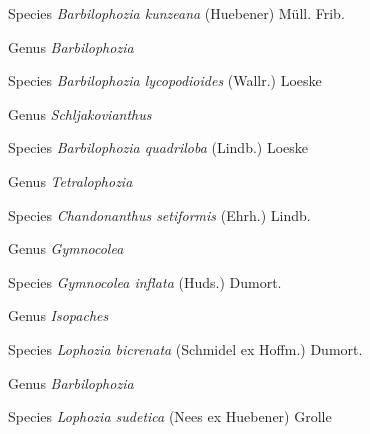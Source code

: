 \documentclass[9pt, article]{memoir}
\begin{document}
\begin{multicols}{2}
\vspace{6pt}\noindent\hspace{36pt}Species \textit{Barbilophozia kunzeana} (Huebener) Müll. Frib.


\vspace{6pt}\noindent\hspace{30pt}Genus \textit{Barbilophozia}


\vspace{6pt}\noindent\hspace{36pt}Species \textit{Barbilophozia lycopodioides} (Wallr.) Loeske


\vspace{6pt}\noindent\hspace{30pt}Genus \textit{Schljakovianthus}


\vspace{6pt}\noindent\hspace{36pt}Species \textit{Barbilophozia quadriloba} (Lindb.) Loeske


\vspace{6pt}\noindent\hspace{30pt}Genus \textit{Tetralophozia}


\vspace{6pt}\noindent\hspace{36pt}Species \textit{Chandonanthus setiformis} (Ehrh.) Lindb.


\vspace{6pt}\noindent\hspace{30pt}Genus \textit{Gymnocolea}


\vspace{6pt}\noindent\hspace{36pt}Species \textit{Gymnocolea inflata} (Huds.) Dumort.


\vspace{6pt}\noindent\hspace{30pt}Genus \textit{Isopaches}


\vspace{6pt}\noindent\hspace{36pt}Species \textit{Lophozia bicrenata} (Schmidel ex Hoffm.) Dumort.


\vspace{6pt}\noindent\hspace{30pt}Genus \textit{Barbilophozia}


\vspace{6pt}\noindent\hspace{36pt}Species \textit{Lophozia sudetica} (Nees ex Huebener) Grolle



\end{multicols}
\end{document}
